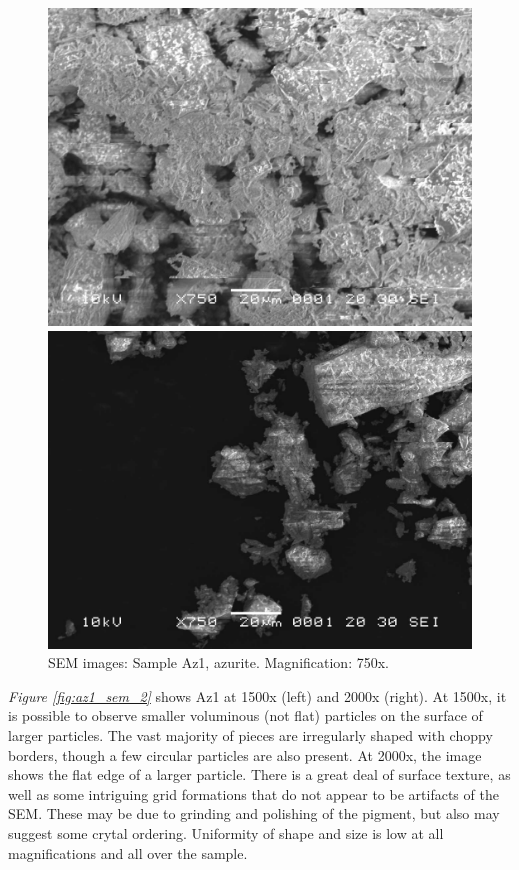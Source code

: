 \begin{figure}[H]
\centering
\begin{minipage}{.45\textwidth}
  \centering
  \includegraphics[width=\linewidth]{Az1_x750_3_220221}
\end{minipage}
\begin{minipage}{.45\textwidth}
  \centering
  \includegraphics[width=\linewidth]{Az1_x750_6_220221}
\end{minipage}
\caption[SEM images: Sample Az1, azurite]{SEM images: Sample Az1, azurite. Magnification: 750x.}
\label{fig:az1_sem_1}
\end{figure}

\textit{Figure \ref{fig:az1_sem_2}} shows Az1 at 1500x (left) and 2000x (right). At 1500x, it is possible to observe smaller voluminous (not flat) particles on the surface of larger particles. The vast majority of pieces are irregularly shaped with choppy borders, though a few circular particles are also present. At 2000x, the image shows the flat edge of a larger particle. There is a great deal of surface texture, as well as some intriguing grid formations that do not appear to be artifacts of the SEM. These may be due to grinding and polishing of the pigment, but also may suggest some crytal ordering. Uniformity of shape and size is low at all magnifications and all over the sample.

